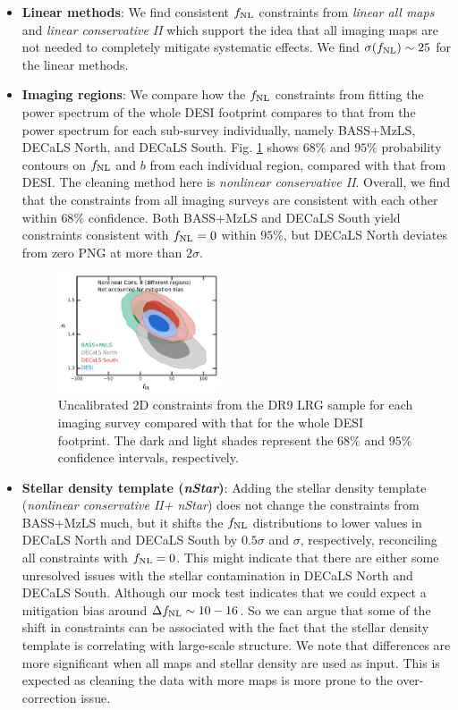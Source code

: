 \begin{itemize}

\item \textbf{Linear methods}: We find consistent $f_{\rm NL}$ constraints from \textit{linear all maps} and \textit{linear conservative II} which support the idea that all imaging maps are not needed to completely mitigate systematic effects. We find $\sigma (f_{\rm NL}) \sim 25$ for the linear methods. 

\item \textbf{Imaging regions}: We compare how the $f_{\rm NL}$ constraints from fitting the power spectrum of the whole DESI footprint compares to that from the power spectrum for each sub-survey individually, namely BASS+MzLS, DECaLS North, and DECaLS South. Fig. \ref{fig:mcmc_dr9reg} shows $68\%$ and $95\%$ probability contours on $f_{\rm NL}$ and $b$ from each individual region, compared with that from DESI. The cleaning method here is \textit{nonlinear conservative II}. Overall, we find that the constraints from all imaging surveys are consistent with each other within $68\%$ confidence. Both BASS+MzLS and DECaLS South yield constraints consistent with $f_{\rm NL}=0$ within $95\%$, but DECaLS North deviates from zero PNG at more than $2\sigma$. 

\begin{figure}
    \centering
    \includegraphics[width=0.45\textwidth]{figures/mcmc_dr9regions.pdf} 
    \caption{Uncalibrated 2D constraints from the DR9 LRG sample for each imaging survey compared with that for the whole DESI footprint. The dark and light shades represent the $68\%$ and $95\%$ confidence intervals, respectively.}\label{fig:mcmc_dr9reg}
\end{figure}

\item \textbf{Stellar density template (\textit{nStar})}: Adding the stellar density template (\textit{nonlinear conservative II+ nStar}) does not change the constraints from BASS+MzLS much, but it shifts the $f_{\rm NL}$ distributions to lower values in DECaLS North and DECaLS South by $0.5\sigma$ and $\sigma$, respectively, reconciling all constraints with $f_{\rm NL}=0$. This might indicate that there are either some unresolved issues with the stellar contamination in DECaLS North and DECaLS South. Although our mock test indicates that we could expect a mitigation bias around $\Delta f_{\rm NL} \sim 10-16$. So we can argue that some of the shift in constraints can be associated with the fact that the stellar density template is correlating with large-scale structure. We note that differences are more significant when all maps and stellar density are used as input. This is expected as cleaning the data with more maps is more prone to the over-correction issue.


\end{itemize}
